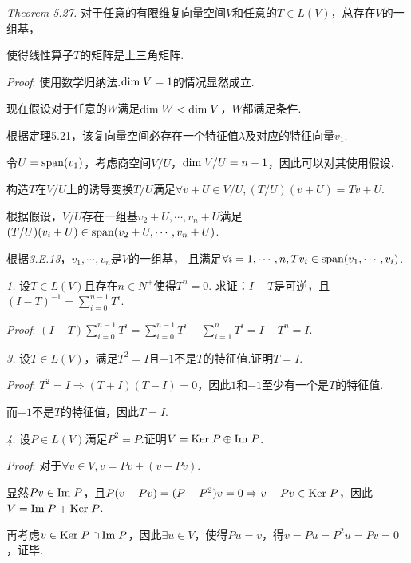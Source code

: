 \textit{Theorem 5.27.}
对于任意的有限维复向量空间\(V\)和任意的\(T \in L(V)\)，总存在\(V\)的一组基，

使得线性算子\(T\)的矩阵是上三角矩阵.

\textit{Proof}:
使用数学归纳法.\(\mathrm{dim \;} V=1\)的情况显然成立.

现在假设对于任意的\(W\)满足\(\mathrm{dim \;} W<\mathrm{dim \;} V\)，\(W\)都满足条件.

根据定理5.21，该复向量空间必存在一个特征值\(\lambda\)及对应的特征向量\(v_1\).

令\(U=\mathrm{span}(v_1)\)，考虑商空间\(V/U\)，\(\mathrm{dim \;} V/U=n-1\)，因此可以对其使用假设.

构造\(T\)在\(V/U\)上的诱导变换\(T/U\)满足\(\forall v+U \in V/U,(T/U)(v+U)=Tv+U\).

根据假设，\(V/U\)存在一组基\(v_2+U,\cdots,v_n+U\)满足\((T/U)(v_i+U) \in \mathrm{span}(v_2+U,\cdots,v_n+U)\).

根据\textit{3.E.13}，\(v_1,\cdots,v_n\)是\(V\)的一组基，
且满足\(\forall i=1,\cdots,n,Tv_i \in \mathrm{span}(v_1,\cdots,v_i)\).

\hspace*{\fill}

\textit{1.}
设\(T \in L(V)\)且存在\(n \in N^+\)使得\(T^n=0\).
求证：\(I-T\)是可逆，且\((I-T)^{-1}=\sum_{i=0}^{n-1} T^i\).

\textit{Proof}:
\((I-T)\sum_{i=0}^{n-1} T^i=\sum_{i=0}^{n-1} T^i-\sum_{i=1}^n T^i=I-T^n=I\).

\hspace*{\fill}

\textit{3.}
设\(T \in L(V)\)，满足\(T^2=I\)且\(-1\)不是\(T\)的特征值.证明\(T=I\).

\textit{Proof}:
\(T^2=I \Rightarrow (T+I)(T-I)=0\)，因此\(1\)和\(-1\)至少有一个是\(T\)的特征值.

而\(-1\)不是\(T\)的特征值，因此\(T=I\).

\hspace*{\fill}

\textit{4.}
设\(P \in L(V)\)满足\(P^2=P\).证明\(V=\mathrm{Ker \;} P \oplus \mathrm{Im \;} P\).

\textit{Proof}:
对于\(\forall v \in V,v=Pv+(v-Pv)\).

显然\(Pv \in \mathrm{Im \;} P\)，且\(P(v-Pv)=(P-P^2)v=0 \Rightarrow v-Pv \in \mathrm{Ker \;} P\)，因此\(V=\mathrm{Im \;} P+\mathrm{Ker \;} P\).

再考虑\(v \in \mathrm{Ker \;} P \cap \mathrm{Im \;} P\)，因此\(\exists u \in V\)，使得\(Pu=v\)，得\(v=Pu=P^2u=Pv=0\)，证毕.

\hspace*{\fill}

